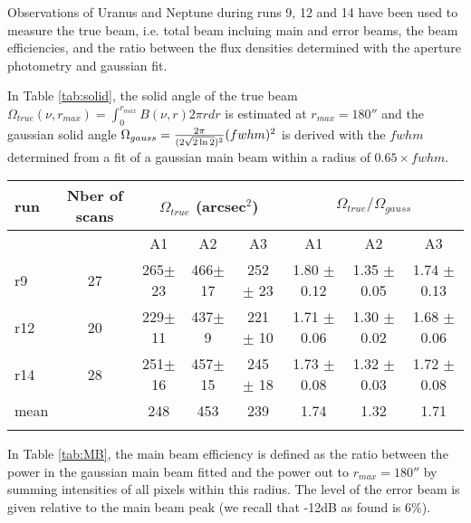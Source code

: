 
Observations of Uranus and Neptune during runs 9, 12 and 14 have been used to measure the true beam, i.e. total beam incluing main and error beams, 
the beam efficiencies, and the ratio between the flux densities determined with the aperture photometry and gaussian fit.

In Table \ref{tab:solid}, the solid angle of the true beam  $\Omega_{true} (\nu,r_{max}) = \int_0^{r_{max}} B(\nu, r) 2 \pi r dr$
is estimated at $r_{max} =180''$ and
the gaussian solid angle $\Omega_{gauss}={{2\pi} \over {(2 \sqrt{2\ln2})^2}} (fwhm)^2$ is derived with the $fwhm$ determined
from a fit of a gaussian main beam within a radius of $0.65 \times fwhm$. 

\begin{table*}[!h]
\caption{Solid angle of true beam based on Uranus and Neptune observations}
\label{tab:solid}
\centering
\begin{tabular}{l| c | c c c | c c c}
\hline\hline
\noalign{\smallskip}
run  & Nber of scans & \multicolumn{3}{c}{$\Omega_{true}$ (arcsec$^{2}$)} & \multicolumn{3}{c}{$\Omega_{true}/\Omega_{gauss}$} \\
\hline
     &               &  A1    &    A2   &  A3  & A1  &  A2  & A3   \\
            \hline
r9    & 27  &  265$\pm$ 23    &  466$\pm$ 17 & 252 $\pm$ 23 &  1.80 $\pm$ 0.12    &  1.35 $\pm$ 0.05   &   1.74 $\pm$ 0.13   \\
r12   & 20  &  229$\pm$ 11    &  437$\pm$  9 & 221 $\pm$ 10 &  1.71 $\pm$ 0.06   &  1.30 $\pm$ 0.02   &   1.68 $\pm$ 0.06   \\
r14   & 28  &  251$\pm$ 16    &  457$\pm$ 15 & 245 $\pm$ 18 &  1.73 $\pm$ 0.08   &  1.32 $\pm$ 0.03   &   1.72 $\pm$ 0.08   \\
mean  &     &  248            &  453         &  239         &  1.74              &   1.32             &   1.71              \\
       \noalign{\smallskip}
            \hline
\end{tabular}
\end{table*}






In Table \ref{tab:MB}, the main beam efficiency is defined as the ratio between the power in the gaussian main beam fitted and 
the power out to $r_{max}=180''$ by summing intensities of all pixels within this radius. The level of the error beam 
is given relative to the main beam peak (we recall that -12dB as found is 6\%). 

